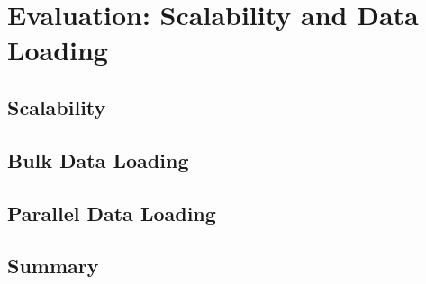 {\chapter{Evaluation: Scalability and Data Loading}
\label{chap:Eval_5}

\section{Scalability}


\section{Bulk Data Loading}


\section{Parallel Data Loading}


\section{Summary}
}
